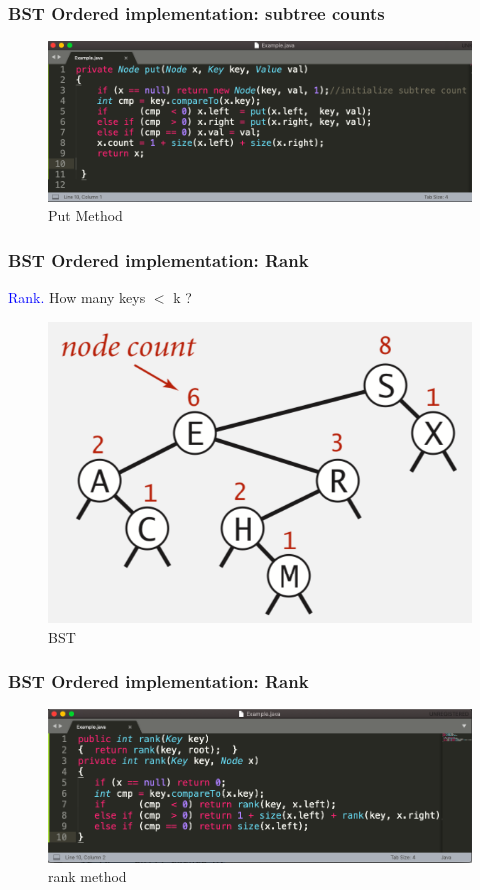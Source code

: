 \documentclass[11pt]{beamer}
\begin{document}
    \begin{frame}[fragile]
    	\frametitle{BST Ordered implementation: subtree counts}
    	\begin{figure}
    		\centering
    		\includegraphics[width=1\linewidth]{"Screenshot 2020-11-04 at 10.44.39 AM"}
    		\caption{Put Method}
    		\label{fig:screenshot-2020-11-04-at-10}
    	\end{figure}
    \end{frame}

    \begin{frame}[fragile]
    	\frametitle{BST Ordered implementation: Rank}
       \textcolor{blue}{Rank. }	How many keys  $< $ k ?
       \begin{figure}
       	\centering
       	\includegraphics[width=0.7\linewidth]{"Screenshot 2020-11-04 at 10.54.45 AM"}
       	\caption{BST}
       	\label{fig:screenshot-2020-11-04-at-10}
       \end{figure}
    \end{frame}

    \begin{frame}[fragile]
    	\frametitle{BST Ordered implementation: Rank}
    	\begin{figure}
    		\centering
    		\includegraphics[width=1.05\linewidth]{"Screenshot 2020-11-04 at 10.56.40 AM"}
    		\caption{rank method}
    		\label{fig:screenshot-2020-11-04-at-10}
    	\end{figure}
    	
    \end{frame}
  
\end{document}
